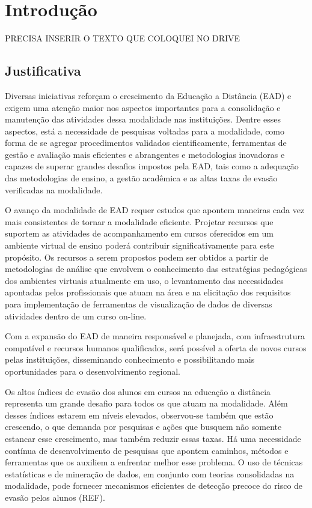 \chapter{Introdução}
PRECISA INSERIR O TEXTO QUE COLOQUEI NO DRIVE
\section{Justificativa}

Diversas iniciativas reforçam o crescimento da Educação a Distância (EAD) e
exigem uma atenção maior nos aspectos importantes para a consolidação e
manutenção das atividades dessa modalidade nas instituições. Dentre esses
aspectos, está a necessidade de pesquisas voltadas para a modalidade, como forma
de se agregar procedimentos validados cientificamente, ferramentas de gestão e
avaliação mais eficientes e abrangentes e metodologias inovadoras e capazes de
superar grandes desafios impostos pela EAD, tais como a adequação das
metodologias de ensino, a gestão acadêmica e as altas taxas de evasão
verificadas na modalidade.

O avanço da modalidade de EAD requer estudos que apontem maneiras cada vez mais
consistentes de tornar a modalidade eficiente. Projetar recursos que suportem as
atividades de acompanhamento em cursos oferecidos em um ambiente virtual de
ensino poderá contribuir significativamente para este propósito. Os recursos a
serem propostos podem ser obtidos a partir de metodologias de análise que
envolvem o conhecimento das estratégias pedagógicas dos ambientes virtuais
atualmente em uso, o levantamento das necessidades apontadas pelos profissionais
que atuam na área e na elicitação dos requisitos para implementação de
ferramentas de visualização de dados de diversas atividades dentro de um curso
on-line.

Com a expansão do EAD de maneira responsável e planejada, com infraestrutura
compatível e recursos humanos qualificados, será possível a oferta de novos
cursos pelas instituições, disseminando conhecimento e possibilitando mais
oportunidades para o desenvolvimento regional.

Os altos índices de evasão dos alunos em cursos na educação a distância
representa um grande desafio para todos os que atuam na modalidade. Além desses
índices estarem em níveis elevados, observou-se também que estão crescendo, o
que demanda por pesquisas e ações que busquem não somente estancar esse
crescimento, mas também reduzir essas taxas. Há uma necessidade contínua de
desenvolvimento de pesquisas que apontem caminhos, métodos e ferramentas que os
auxiliem a enfrentar melhor esse problema. O uso de técnicas estatísticas e de
mineração de dados, em conjunto com teorias consolidadas na modalidade, pode
fornecer mecanismos eficientes de detecção precoce do risco de evasão pelos
alunos (REF).

